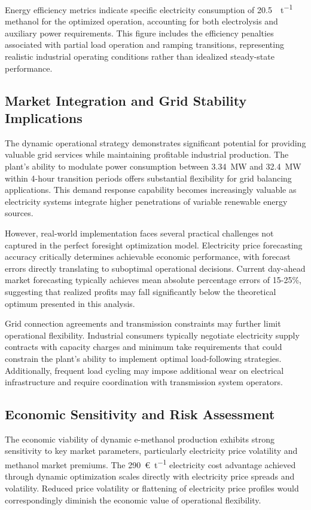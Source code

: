\documentclass[12pt,a4paper]{article}
\begin{document}
Energy efficiency metrics indicate specific electricity consumption of \SI{20.5}{\MWh\per\tonne} methanol for the optimized operation, accounting for both electrolysis and auxiliary power requirements. This figure includes the efficiency penalties associated with partial load operation and ramping transitions, representing realistic industrial operating conditions rather than idealized steady-state performance.

\subsection{Market Integration and Grid Stability Implications}

The dynamic operational strategy demonstrates significant potential for providing valuable grid services while maintaining profitable industrial production. The plant's ability to modulate power consumption between \SI{3.34}{\mega\watt} and \SI{32.4}{\mega\watt} within 4-hour transition periods offers substantial flexibility for grid balancing applications. This demand response capability becomes increasingly valuable as electricity systems integrate higher penetrations of variable renewable energy sources.

However, real-world implementation faces several practical challenges not captured in the perfect foresight optimization model. Electricity price forecasting accuracy critically determines achievable economic performance, with forecast errors directly translating to suboptimal operational decisions. Current day-ahead market forecasting typically achieves mean absolute percentage errors of 15-25\%, suggesting that realized profits may fall significantly below the theoretical optimum presented in this analysis.

Grid connection agreements and transmission constraints may further limit operational flexibility. Industrial consumers typically negotiate electricity supply contracts with capacity charges and minimum take requirements that could constrain the plant's ability to implement optimal load-following strategies. Additionally, frequent load cycling may impose additional wear on electrical infrastructure and require coordination with transmission system operators.

\subsection{Economic Sensitivity and Risk Assessment}

The economic viability of dynamic e-methanol production exhibits strong sensitivity to key market parameters, particularly electricity price volatility and methanol market premiums. The \SI{290}{\euro\per\tonne} electricity cost advantage achieved through dynamic optimization scales directly with electricity price spreads and volatility. Reduced price volatility or flattening of electricity price profiles would correspondingly diminish the economic value of operational flexibility.
\end{document}
